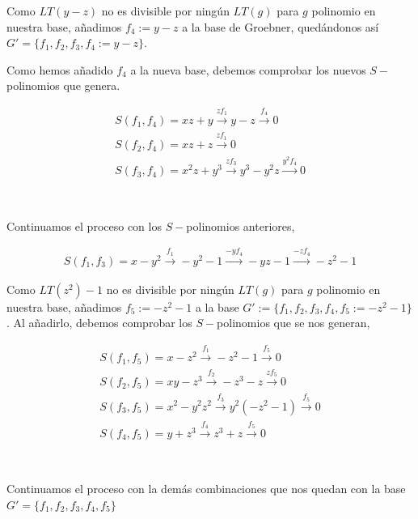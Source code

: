 \documentclass{article}
\begin{document}
Como $LT(y - z)$ no es divisible por ningún $LT(g)$ para $g$ polinomio
en nuestra base, añadimos $f_4:=y-z$ a la base de Groebner, quedándonos
así $G'= \{f_1, f_2, f_3, f_4:=y-z\}$.

Como hemos añadido $f_4$ a la nueva base, debemos comprobar los nuevos
$S-$polinomios que genera.

\begin{equation}
    \begin{array}{l}
        S(f_1, f_4) = xz + y \xrightarrow{z f_1} y - z \xrightarrow{f_4} 0\\    
        S(f_2, f_4) = xz + z \xrightarrow{z f_1} 0 \\
        S(f_3, f_4) = x^2z + y^3 \xrightarrow{z f_3} y^3 - y^2z \xrightarrow{y^2 f_4} 0 
    \end{array}
\end{equation}

~

    Continuamos el proceso con los $S-$polinomios anteriores,

\begin{equation}
    \begin{array}{l}
        S(f_1, f_3) = x - y^2 \xrightarrow{f_1} -y^2 - 1 \xrightarrow{-y f_4} -yz - 1 \xrightarrow{-z f_4} -z^2-1 
    \end{array}
\end{equation}

Como $LT(z^2) - 1$ no es divisible por ningún $LT(g)$ para $g$ polinomio
en nuestra base, añadimos $f_5:=-z^2 - 1$ a la base
$G':=\{f_1, f_2, f_3, f_4, f_5:=-z^2 - 1\}$. Al añadirlo, debemos
comprobar los $S-$polinomios que se nos generan,

\begin{equation}
    \begin{array}{l}
        S(f_1, f_5) = x-z^2 \xrightarrow{f_1} -z^2 - 1 \xrightarrow{f_ 5} 0 \\
        S(f_2, f_5) =  xy-z^3 \xrightarrow{f_2} -z^3 - z \xrightarrow{z f_5} 0 \\
        S(f_3, f_5) = x^2-y^2z^2 \xrightarrow{f_3} y^2(-z^2 - 1) \xrightarrow{f_5} 0\\
        S(f_4, f_5) = y + z^3 \xrightarrow{f_4} z^3 + z \xrightarrow{f_5} 0
    \end{array}
\end{equation}

~

    Continuamos el proceso con la demás combinaciones que nos quedan con la
base $G'=\{f_1, f_2, f_3, f_4, f_5\}$
\end{document}
